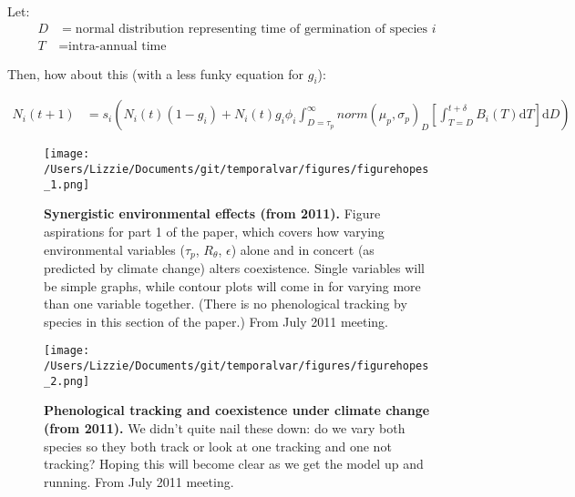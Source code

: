 \documentclass[11pt,a4paper,oneside]{article}
\begin{document}
\noindent Let:
\begin{align*}
D & = \text{normal distribution representing time of germination of species }i\\
T & = \text{intra-annual time}
\end{align*}

\noindent Then, how about this (with a less funky equation for \(g_{i}\)):

\begin{align*}
N_{i}(t+1) & =
s_{i}(N_{i}(t)(1-g_{i})+N_{i}(t)g_{i}\phi_{i}\int_{D=\tau_{p}}^{\infty}norm(\mu_{p}, \sigma_{p})_{D} [\int_{T=D}^{t+\delta}B_{i}(T) \mathrm{d}T] \mathrm{d}D)
\end{align*}

\newpage
\begin{figure}[h!]
\centering
\noindent \texttt{[image: /Users/Lizzie/Documents/git/temporalvar/figures/figurehopes\_1.png]}
\caption{{\bf Synergistic environmental effects (from 2011).}  Figure aspirations
  for part 1 of the paper, which covers how varying environmental
  variables (\(\tau_{p}\), \(R_{\theta}\), \(\epsilon\)) alone and in concert (as predicted by climate change)
  alters coexistence. Single variables will be simple graphs, while
  contour plots will come in for varying more than one variable
  together. (There is no phenological tracking by species in this
  section of the paper.) From July 2011 meeting.}
\end{figure}

\newpage
\begin{figure}[h!]
\centering
\noindent \texttt{[image: /Users/Lizzie/Documents/git/temporalvar/figures/figurehopes\_2.png]}
\caption{{\bf Phenological tracking and coexistence under climate
    change (from 2011).}  We didn't quite nail these down: do we vary both species
so they both track or look at one tracking and one not tracking?
Hoping this will become clear as we get the model up and running. From July 2011 meeting.}
\end{figure}
\end{document}
